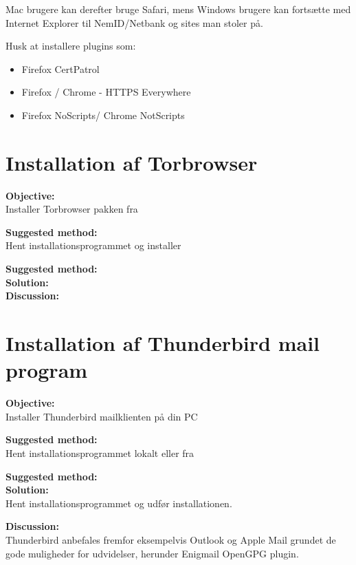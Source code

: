 \documentclass[a4paper,11pt,notitlepage]{report}
\begin{document}
Mac brugere kan derefter bruge Safari, mens Windows brugere kan fortsætte med Internet Explorer til NemID/Netbank og sites man stoler på.

Husk at installere plugins som:
\begin{itemize}
\item Firefox CertPatrol
\item Firefox / Chrome - HTTPS Everywhere
\item Firefox NoScripts/ Chrome NotScripts
\end{itemize}


\chapter{Installation af Torbrowser}
\label{ex:torbrowser}

{\bf Objective:}\\
Installer Torbrowser pakken fra 

{\bf Suggested method:}\\
Hent installationsprogrammet og installer

{\bf Suggested method:}\\

{\bf Solution:}\\

{\bf Discussion:}\\





\chapter{Installation af Thunderbird mail program}
\label{ex:thunderbird}



{\bf Objective:}\\
Installer Thunderbird mailklienten på din PC

{\bf Suggested method:}\\
Hent installationsprogrammet lokalt eller fra 

{\bf Suggested method:}\\

{\bf Solution:}\\
Hent installationsprogrammet og udfør installationen.

{\bf Discussion:}\\
Thunderbird anbefales fremfor eksempelvis Outlook og Apple Mail grundet de
gode muligheder for udvidelser, herunder Enigmail OpenGPG plugin.
\end{document}
